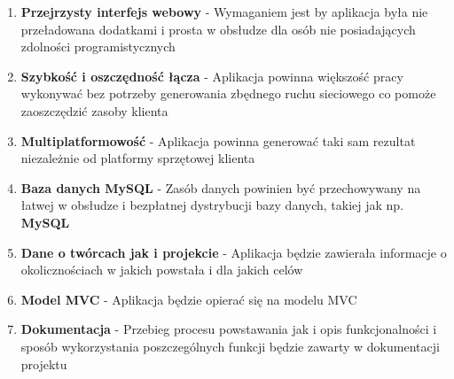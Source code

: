 \begin{enumerate}
  \item \textbf{Przejrzysty interfejs webowy} - Wymaganiem jest by aplikacja była nie przeładowana dodatkami i prosta w obsłudze dla osób nie posiadających zdolności programistycznych

  \item \textbf{Szybkość i oszczędność łącza} - Aplikacja powinna większość pracy wykonywać bez potrzeby generowania zbędnego ruchu sieciowego co pomoże zaoszczędzić zasoby klienta

  \item \textbf{Multiplatformowość} - Aplikacja powinna generować taki sam rezultat niezależnie od platformy sprzętowej klienta

  \item \textbf{Baza danych MySQL} - Zasób danych powinien być przechowywany na łatwej w obsłudze i bezpłatnej dystrybucji bazy danych, takiej jak np. \textbf{MySQL}

  \item \textbf{Dane o twórcach jak i projekcie} - Aplikacja będzie zawierała informacje o okolicznościach w jakich powstała i dla jakich celów

  \item \textbf{Model MVC} - Aplikacja będzie opierać się na modelu MVC

  \item \textbf{Dokumentacja} - Przebieg procesu powstawania jak i opis funkcjonalności i sposób wykorzystania poszczególnych funkcji będzie zawarty w dokumentacji projektu
\end{enumerate}
